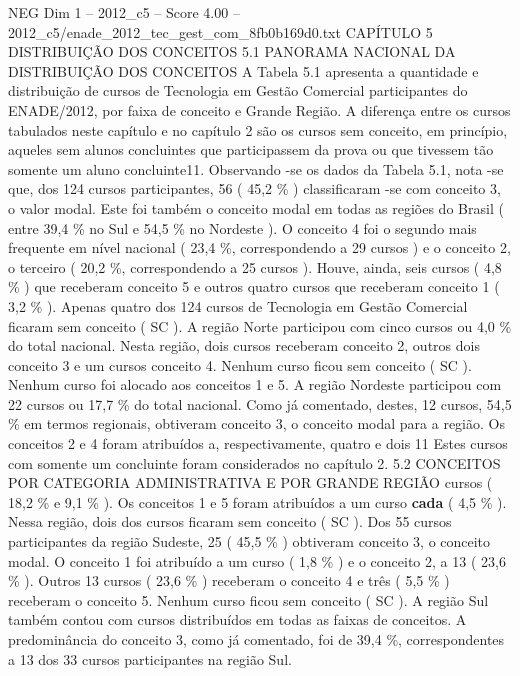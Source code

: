 \begin{textsample}{NEG Dim 1 – 2012\_c5 – Score 4.00 – 2012\_c5/enade\_2012\_tec\_gest\_com\_8fb0b169d0.txt}  \label{ex:f1_neg_323}
CAPÍTULO 5 DISTRIBUIÇÃO DOS CONCEITOS 5.1 PANORAMA NACIONAL DA DISTRIBUIÇÃO DOS CONCEITOS A Tabela 5.1 apresenta a quantidade e distribuição de cursos de Tecnologia em Gestão Comercial participantes do ENADE/2012, por faixa de conceito e Grande Região.
A diferença entre os cursos tabulados neste capítulo e no capítulo 2 são os cursos sem conceito, em princípio, aqueles sem alunos concluintes que participassem da prova ou que tivessem tão somente um aluno concluinte11.
Observando -se os dados da Tabela 5.1, nota -se que, dos 124 cursos participantes, 56 ( 45,2 \% ) classificaram -se com conceito 3, o valor modal.
Este foi também o conceito modal em todas as regiões do Brasil ( entre 39,4 \% no Sul e 54,5 \% no Nordeste ).
O conceito 4 foi o segundo mais frequente em nível nacional ( 23,4 \%, correspondendo a 29 cursos ) e o conceito 2, o terceiro ( 20,2 \%, correspondendo a 25 cursos ).
Houve, ainda, seis cursos ( 4,8 \% ) que receberam conceito 5 e outros quatro cursos que receberam conceito 1 ( 3,2 \% ).
Apenas quatro dos 124 cursos de Tecnologia em Gestão Comercial ficaram sem conceito ( SC ).
A região Norte participou com cinco cursos ou 4,0 \% do total nacional.
Nesta região, dois cursos receberam conceito 2, outros dois conceito 3 e um cursos conceito 4.
Nenhum curso ficou sem conceito ( SC ).
Nenhum curso foi alocado aos conceitos 1 e 5.
A região Nordeste participou com 22 cursos ou 17,7 \% do total nacional.
Como já comentado, destes, 12 cursos, 54,5 \% em termos regionais, obtiveram conceito 3, o conceito modal para a região.
Os conceitos 2 e 4 foram atribuídos a, respectivamente, quatro e dois 11 Estes cursos com somente um concluinte foram considerados no capítulo 2. 5.2 CONCEITOS POR CATEGORIA ADMINISTRATIVA E POR GRANDE REGIÃO cursos ( 18,2 \% e 9,1 \% ).
Os conceitos 1 e 5 foram atribuídos a um curso \textbf{cada} ( 4,5 \% ).
Nessa região, dois dos cursos ficaram sem conceito ( SC ).
Dos 55 cursos participantes da região Sudeste, 25 ( 45,5 \% ) obtiveram conceito 3, o conceito modal.
O conceito 1 foi atribuído a um curso ( 1,8 \% ) e o conceito 2, a 13 ( 23,6 \% ).
Outros 13 cursos ( 23,6 \% ) receberam o conceito 4 e três ( 5,5 \% ) receberam o conceito 5.
Nenhum curso ficou sem conceito ( SC ).
A região Sul também contou com cursos distribuídos em todas as faixas de conceitos.
A predominância do conceito 3, como já comentado, foi de 39,4 \%, correspondentes a 13 dos 33 cursos participantes na região Sul.

\end{textsample}
